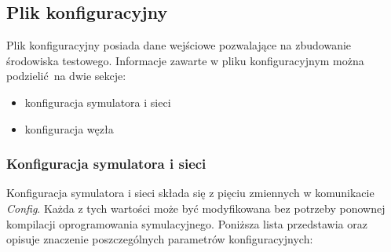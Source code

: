 \documentclass[a4paper,12pt,twoside,openany]{report}
\begin{document}
\subsection{Plik konfiguracyjny}

Plik konfiguracyjny posiada dane wejściowe pozwalające na zbudowanie środowiska testowego. 
Informacje zawarte w pliku konfiguracyjnym można podzielić na dwie sekcje:

\begin{itemize}
 \item konfiguracja symulatora i sieci
 \item konfiguracja węzła
\end{itemize}

\subsubsection{Konfiguracja symulatora i sieci}

Konfiguracja symulatora i sieci składa się z pięciu zmiennych w komunikacie \textit{Config}. Każda z tych wartości może być modyfikowana bez potrzeby
ponownej kompilacji oprogramowania symulacyjnego. Poniższa lista przedstawia oraz opisuje znaczenie poszczególnych parametrów konfiguracyjnych:
\end{document}
